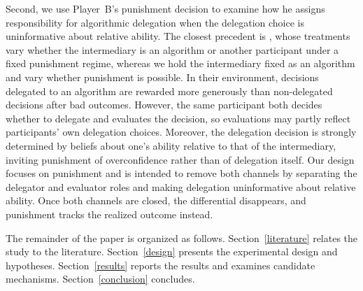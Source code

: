 Second, we use Player~B's punishment decision to examine how he assigns responsibility for algorithmic delegation when the delegation choice is uninformative about relative ability. The closest precedent is \citet{feier_hiding_2022}, whose treatments vary whether the intermediary is an algorithm or another participant under a fixed punishment regime, whereas we hold the intermediary fixed as an algorithm and vary whether punishment is possible. In their environment, decisions delegated to an algorithm are rewarded more generously than non-delegated decisions after bad outcomes. However, the same participant both decides whether to delegate and evaluates the decision, so evaluations may partly reflect participants’ own delegation choices. Moreover, the delegation decision is strongly determined by beliefs about one's ability relative to that of the intermediary, inviting punishment of overconfidence rather than of delegation itself. Our design focuses on punishment and is intended to remove both channels by separating the delegator and evaluator roles and making delegation uninformative about relative ability. Once both channels are closed, the differential disappears, and punishment tracks the realized outcome instead.

The remainder of the paper is organized as follows. Section~\ref{literature} relates the study to the literature. Section~\ref{design} presents the experimental design and hypotheses. Section~\ref{results} reports the results and examines candidate mechanisms. Section~\ref{conclusion} concludes.


